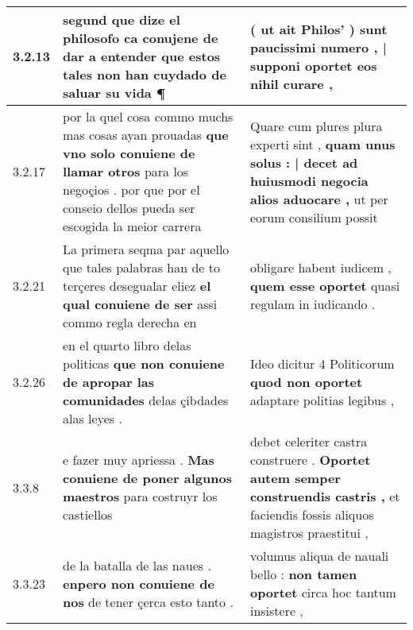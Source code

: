\begin{tabular}{|p{1cm}|p{6.5cm}|p{6.5cm}|}
3.2.13 & segund que dize el philosofo \textbf{ ca conujene de dar a entender } que estos tales non han cuydado de saluar su vida ¶ & ( ut ait Philos’ ) \textbf{ sunt paucissimi numero , | supponi oportet } eos nihil curare , \\\hline
3.2.17 & por la quel cosa commo muchs mas cosas ayan prouadas \textbf{ que vno solo conuiene de llamar otros } para los negoçios . por que por el conseio dellos pueda ser escogida la meior carrera & Quare cum plures plura experti sint , \textbf{ quam unus solus : | decet ad huiusmodi negocia alios aduocare , } ut per eorum consilium possit \\\hline
3.2.21 & La primera seqma par aquello que tales palabras han de to terçeres desegualar eliez \textbf{ el qual conuiene de ser } assi commo regla derecha en & obligare habent iudicem , \textbf{ quem esse oportet } quasi regulam in iudicando . \\\hline
3.2.26 & en el quarto libro delas politicas \textbf{ que non conuiene de apropar las comunidades } delas çibdades alas leyes . & Ideo dicitur 4 Politicorum \textbf{ quod non oportet } adaptare politias legibus , \\\hline
3.3.8 & e fazer muy apriessa . \textbf{ Mas conuiene de poner algunos maestros } para costruyr los castiellos & debet celeriter castra construere . \textbf{ Oportet autem semper construendis castris , } et faciendis fossis aliquos magistros praestitui , \\\hline
3.3.23 & de la batalla de las naues . \textbf{ enpero non conuiene de nos } de tener çerca esto tanto . & volumus aliqua de nauali bello : \textbf{ non tamen oportet } circa hoc tantum insistere , \\\hline

\end{tabular}

